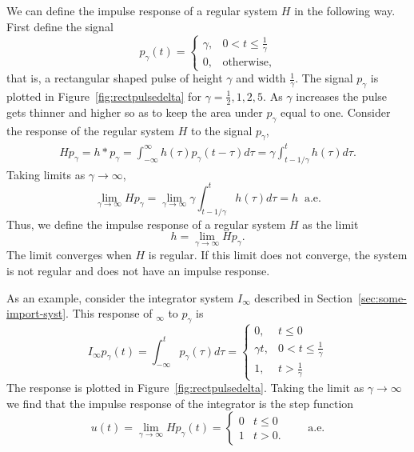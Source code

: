 We can define the impulse response of a regular system $H$ in the following way.  First define the signal
\[
p_\gamma(t) = \begin{cases}
\gamma, & 0 < t \leq \frac{1}{\gamma} \\
0, & \text{otherwise},
\end{cases}
\]
that is, a rectangular shaped pulse of height $\gamma$ and width $\tfrac{1}{\gamma}$.  The signal $p_\gamma$ is plotted in Figure~\ref{fig:rectpulsedelta} for $\gamma=\frac{1}{2},1,2,5$.  As $\gamma$ increases the pulse gets thinner and higher so as to keep the area under $p_\gamma$ equal to one.  Consider the response of the regular system $H$ to the signal $p_\gamma$,
\begin{align*}
H p_\gamma = h * p_\gamma = \int_{-\infty}^\infty h(\tau) p_\gamma(t - \tau) d\tau = \gamma \int_{t- 1/\gamma}^{t} h(\tau) d\tau.
\end{align*}
Taking limits as $\gamma\rightarrow\infty$,
\[
\lim_{\gamma \rightarrow \infty} H p_\gamma = \lim_{\gamma \rightarrow \infty} \gamma \int_{t- 1/\gamma}^{t} h(\tau) d\tau = h \;\; \text{a.e.}
\]
Thus, we define the impulse response of a regular system $H$ as the limit  
\begin{equation}\label{eq:defnimpulseresponse}
h = \lim_{\gamma \rightarrow \infty} H p_\gamma.  
\end{equation}
The limit converges when $H$ is regular.  If this limit does not converge, the system is not regular and does not have an impulse response.  %


As an example, consider the integrator system $I_\infty$ described in Section~\ref{sec:some-import-syst}.  This response of $_\infty$ to $p_\gamma$ is 
\[
I_\infty p_\gamma(t) = \int_{-\infty}^{t} p_\gamma(\tau) d\tau = \begin{cases}
0, & t \leq 0 \\
\gamma t, & 0 < t \leq \frac{1}{\gamma} \\
1, & t > \frac{1}{\gamma}
\end{cases}
\]
The response is plotted in Figure~\ref{fig:rectpulsedelta}.  Taking the limit as $\gamma \rightarrow\infty$ we find that the impulse response of the integrator is the step function
\begin{equation}\label{eq:utimprespstep}
u(t) = \lim_{\gamma\rightarrow\infty} H p_\gamma(t) = \begin{cases}
0 & t \leq 0 \\
1 & t > 0.
\end{cases} \qquad \text{a.e.}
\end{equation}


